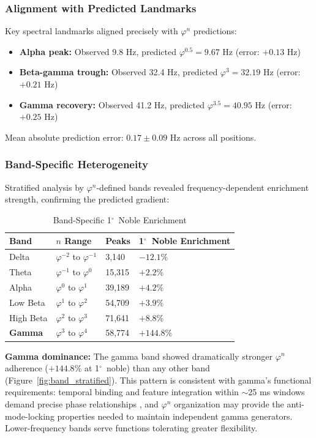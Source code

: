 \documentclass[11pt,a4paper]{article}
\newcommand{\degree}{$^\circ$}  %
\newcommand{\phisym}{\varphi}
\begin{document}
\subsubsection{Alignment with Predicted Landmarks}
Key spectral landmarks aligned precisely with $\phisym^n$ predictions:
\begin{itemize}
    \item \textbf{Alpha peak:} Observed 9.8 Hz, predicted $\phisym^{0.5} = 9.67$ Hz (error: $+0.13$ Hz)
    \item \textbf{Beta-gamma trough:} Observed 32.4 Hz, predicted $\phisym^3 = 32.19$ Hz (error: $+0.21$ Hz)
    \item \textbf{Gamma recovery:} Observed 41.2 Hz, predicted $\phisym^{3.5} = 40.95$ Hz (error: $+0.25$ Hz)
\end{itemize}

Mean absolute prediction error: $0.17 \pm 0.09$ Hz across all positions.

\subsubsection{Band-Specific Heterogeneity}
Stratified analysis by $\phisym^n$-defined bands revealed frequency-dependent enrichment strength, confirming the predicted gradient:

\begin{table}[H]
\centering
\caption{Band-Specific 1\degree\ Noble Enrichment}
\label{tab:band_enrichment}
\begin{tabular}{@{}llll@{}}
\toprule
Band & $n$ Range & Peaks & 1\degree\ Noble Enrichment \\
\midrule
Delta & $\phisym^{-2}$ to $\phisym^{-1}$ & 3,140 & $-12.1\%$ \\
Theta & $\phisym^{-1}$ to $\phisym^{0}$ & 15,315 & $+2.2\%$ \\
Alpha & $\phisym^{0}$ to $\phisym^{1}$ & 39,189 & $+4.2\%$ \\
Low Beta & $\phisym^{1}$ to $\phisym^{2}$ & 54,709 & $+3.9\%$ \\
High Beta & $\phisym^{2}$ to $\phisym^{3}$ & 71,641 & $+8.8\%$ \\
\textbf{Gamma} & $\phisym^{3}$ to $\phisym^{4}$ & 58,774 & $\mathbf{+144.8\%}$ \\
\bottomrule
\end{tabular}
\end{table}

\textbf{Gamma dominance:} The gamma band showed dramatically stronger $\phisym^n$ adherence ($+144.8\%$ at 1\degree\ noble) than any other band (Figure~\ref{fig:band_stratified}). This pattern is consistent with gamma's functional requirements: temporal binding and feature integration within $\sim$25 ms windows demand precise phase relationships \parencite{bartos2007synaptic}, and $\phisym^n$ organization may provide the anti-mode-locking properties needed to maintain independent gamma generators. Lower-frequency bands serve functions tolerating greater flexibility.
\end{document}
